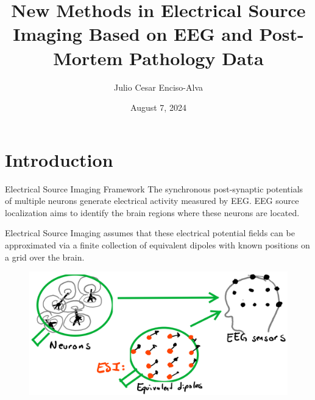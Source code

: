 \documentclass[progressbar=head]{beamer}
\title{New Methods in Electrical Source Imaging Based on EEG and Post-Mortem Pathology Data}
\date{August 7, 2024}
\author{Julio Cesar Enciso-Alva}
\institute{University   of Texas at Arlington}
\begin{document}

{
\maketitle

\begin{frame}%
\tableofcontents
\end{frame}
}

{
\section{Introduction}
}

\begin{frame}{Electrical Source Imaging Framework}
    The synchronous post-synaptic potentials of multiple neurons generate electrical activity measured by EEG.
    EEG source localization aims to identify the brain regions where these neurons are located.
    
    Electrical Source Imaging assumes that 
    these electrical potential fields
    can be 
    approximated via a finite collection 
    of equivalent dipoles
    with known positions on a grid over the brain.

\begin{figure}
\centering
\includegraphics[width=0.6\linewidth]{./img_oldbeamer/sketch03}
\end{figure}
\end{frame}
\end{document}
